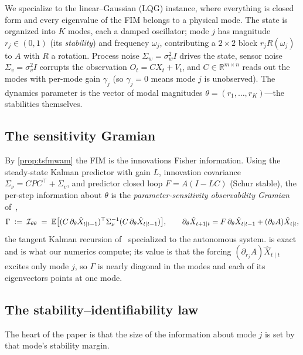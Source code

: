 \documentclass[10pt]{article}
\theoremstyle{plain}
\theoremstyle{definition}
\theoremstyle{remark}
\newcommand{\R}{\mathbb{R}}
\newcommand{\E}{\mathbb{E}}
\newcommand{\Fisher}{\mathcal{I}}
\newcommand{\Ith}{\Fisher_{\theta\theta}}
\newcommand{\Gam}{\Gamma}
\newcommand{\defeq}{\vcentcolon=}
\begin{document}
We specialize to the linear--Gaussian (LQG) instance, where everything is closed
form and every eigenvalue of the FIM belongs to a physical mode. The state is
organized into $K$ modes, each a damped oscillator; mode $j$ has magnitude
$r_j\in(0,1)$ (its \emph{stability}) and frequency $\omega_j$, contributing a
$2\times2$ block $r_j R(\omega_j)$ to $A$ with $R$ a rotation. Process noise
$\Sigma_w=\sigma_w^2 I$ drives the state, sensor noise $\Sigma_v=\sigma_v^2 I$
corrupts the observation $O_t=CX_t+V_t$, and $C\in\R^{m\times n}$ reads out the
modes with per-mode gain $\gamma_j$ (so $\gamma_j=0$ means mode $j$ is
unobserved). The dynamics parameter is the vector of modal magnitudes
$\theta=(r_1,\dots,r_K)$---the stabilities themselves.

\subsection{The sensitivity Gramian}
By \cref{prop:tsfmwam} the FIM is the innovations Fisher information. Using the
steady-state Kalman predictor with gain $L$, innovation covariance
$\Sigma_\nu=CPC^\top+\Sigma_v$, and predictor closed loop $F=A(I-LC)$ (Schur
stable), the per-step information about $\theta$ is the
\emph{parameter-sensitivity observability Gramian} of~\cite[Cor.~9.5]{wamvla},
\begin{equation}
 \Gam \;\defeq\; \Ith \;=\;
 \E\big[(C\,\partial_\theta\hat X_{t\mid t-1})^\top\Sigma_\nu^{-1}
        (C\,\partial_\theta\hat X_{t\mid t-1})\big],\qquad
 \partial_\theta\hat X_{t+1\mid t}=F\,\partial_\theta\hat X_{t\mid t-1}
   +(\partial_\theta A)\hat X_{t\mid t},
 \label{eq:gramian}
\end{equation}
the tangent Kalman recursion of~\cite[App.~A]{wamvla} specialized to the
autonomous system.  is exact and is what our numerics compute;
its value is that the forcing $(\partial_{r_j}A)\hat X_{t\mid t}$ excites only
mode $j$, so $\Gam$ is nearly diagonal in the modes and each of its eigenvectors
points at one mode.

\subsection{The stability--identifiability law}
The heart of the paper is that the size of the information about mode $j$ is set
by that mode's stability margin.
\end{document}
